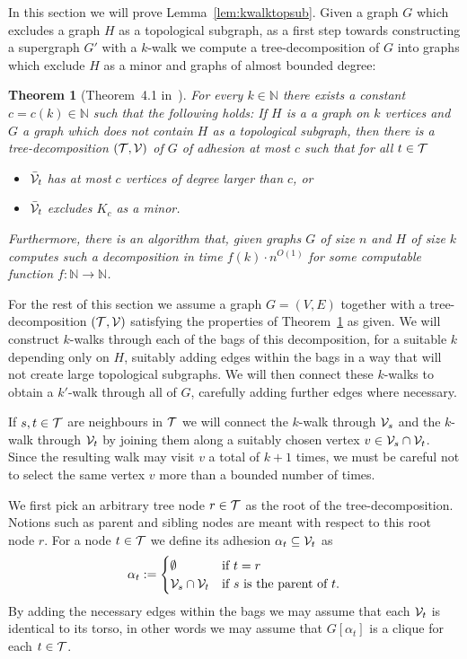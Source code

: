 \documentclass[12pt]{amsart}
\newtheorem{theorem}{Theorem}[section]
\newcommand{\N}{\mathds{N}}
\begin{document}
In this section we will prove Lemma~\ref{lem:kwalktopsub}. Given a
graph $G$ which excludes a graph $H$ as a topological subgraph, as a
first step towards constructing a supergraph $G'$ with a $k$-walk we
compute a tree-decomposition of $G$ into graphs which exclude $H$ as a
minor and graphs of almost bounded degree:
\begin{theorem}[Theorem~4.1 in~\cite{gromar12+}]
  \label{thm:topminstructure}
  For every $k \in \N$ there exists a constant $c = c(k) \in \N$ such
  that the following holds: If $H$ is a a graph on $k$ vertices and
  $G$ a graph which does not contain $H$ as a topological subgraph, then
  there is a tree-decomposition $(\mathcal{T},\mathcal{V})$ of $G$ of adhesion at
  most $c$ such that for all $t \in \mathcal{T}$
  \begin{itemize}
  \item  ${\bar{\mathcal{V}}}_t$ has at most $c$ vertices of degree larger than
    $c$, \emph{or}
  \item  ${\bar{\mathcal{V}}}_t$ excludes $K_c$ as a minor.
  \end{itemize}
  Furthermore, there is an algorithm that, given graphs $G$ of size
  $n$ and $H$ of size $k$ computes such a decomposition in time
  $f(k)\cdot n^{O(1)}$ for some computable function $f:\N\to\N$.
\end{theorem}

For the rest of this section we assume a graph $G = (V,E)$ together
with a tree-decomposition $(\mathcal{T},\mathcal{V})$ satisfying the properties of
Theorem~\ref{thm:topminstructure} as given. We will construct
$k$-walks through each of the bags of this decomposition, for a
suitable $k$ depending only on $H$, suitably adding edges within the
bags in a way that will not create large topological subgraphs. We
will then connect these $k$-walks to obtain a $k'$-walk through all of
$G$, carefully adding further edges where necessary.

If $s,t \in \mathcal{T}$ are neighbours in $\mathcal{T}$ we will connect the
$k$-walk through $\mathcal{V}_s$ and the $k$-walk through $\mathcal{V}_t$ by
joining them along a suitably chosen vertex $v \in \mathcal{V}_s \cap
\mathcal{V}_t$. Since the resulting walk may visit $v$ a total of $k+1$
times, we must be careful not to select the same vertex $v$ more than
a bounded number of times.

We first pick an arbitrary tree node $r \in \mathcal{T}$ as the root of the
tree-decomposition. Notions such as parent and sibling nodes are meant
with respect to this root node $r$. For a node $t \in \mathcal{T}$ we define
its adhesion $\alpha_t \subseteq \mathcal{V}_t$ as
\[
\alpha_t := \begin{cases}
  \emptyset & \text{if }t = r
  \\
  \mathcal{V}_s \cap \mathcal{V}_t & \text{if }s\text{ is the parent of }t.
  \end{cases}
\]
By adding the necessary edges within the bags we may assume that each
$\mathcal{V}_t$ is identical to its torso, in other words we may assume that
$G[\alpha_t]$ is a clique for each $t \in \mathcal{T}$.
\end{document}
